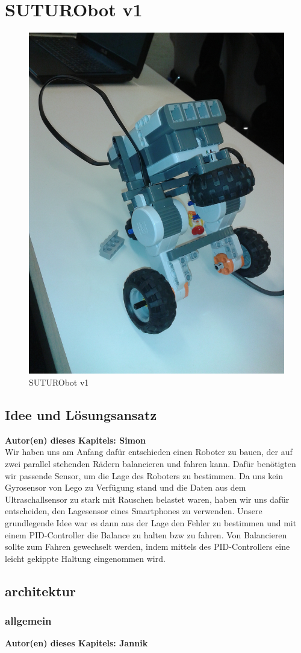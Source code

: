 \documentclass[8pt]{article}
\newcommand{\secauthor}[1]{\textbf{Autor(en) dieses Kapitels: {#1}}\\}
\begin{document}
\section{SUTURObot v1}
\begin{figure}[h]
  \begin{center}
    \includegraphics[width=.5\textwidth]{pictures/SUTURObot-v1.jpg}  
  \end{center}
  \caption{SUTURObot v1}
  \label{fig:SUTURObot1}
\end{figure}

\subsection{Idee und Lösungsansatz} 
\secauthor{Simon}
Wir haben uns am Anfang dafür entschieden einen Roboter zu bauen, der auf zwei parallel stehenden Rädern balancieren und fahren kann. Dafür benötigten wir passende Sensor, um die Lage des Roboters zu bestimmen. Da uns kein Gyrosensor von Lego zu Verfügung stand und die Daten aus dem Ultraschallsensor zu stark mit Rauschen belastet waren, haben wir uns dafür entscheiden, den Lagesensor eines Smartphones zu verwenden. Unsere grundlegende Idee war es dann aus der Lage den Fehler zu bestimmen und mit einem PID-Controller die Balance zu halten bzw zu fahren. Von Balancieren sollte zum Fahren gewechselt werden, indem mittels des PID-Controllers eine leicht gekippte Haltung eingenommen wird.

\subsection{architektur}

\subsubsection{allgemein} 
\secauthor{Jannik}
\end{document}
